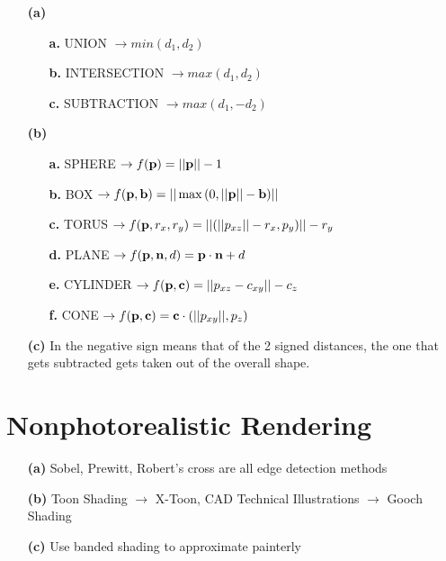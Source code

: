 \documentclass{article}
\begin{document}
\begin{itemize}
    \item[\textbf{(a)}]
        \begin{itemize}
            \item[\textbf{a.}] UNION $\rightarrow{} min(d_1, d_2)$
            \item[\textbf{b.}] INTERSECTION $\rightarrow{} max(d_1, d_2) $
            \item[\textbf{c.}] SUBTRACTION $\rightarrow{} max(d_1, -d_2) $
        \end{itemize}

    \item[\textbf{(b)}]
        \begin{itemize}
            \item[\textbf{a.}] SPHERE $\rightarrow{} f(\mathbf{p}) = ||\mathbf{p}|| - 1$
            \item[\textbf{b.}] BOX $\rightarrow{} f(\mathbf{p}, \mathbf{b}) = ||\max{(0, ||\mathbf{p}||-\mathbf{b})}||$

            \item[\textbf{c.}] TORUS $\rightarrow{} f(\mathbf{p}, r_x, r_y) = ||(||p_{xz}|| - r_x, p_y)|| - r_y$

            \item[\textbf{d.}] PLANE $\rightarrow{} f(\mathbf{p}, \mathbf{n}, d) = \mathbf{p} \cdot \mathbf{n} + d$

            \item[\textbf{e.}] CYLINDER $\rightarrow{} f(\mathbf{p}, \mathbf{c}) = ||p_{xz} - c_{xy}|| - c_z$

            \item[\textbf{f.}] CONE $\rightarrow{} f(\mathbf{p}, \mathbf{c}) = \mathbf{c} \cdot (||p_{xy}||, p_z)$
        \end{itemize}
    \item[\textbf{(c)}] In the negative sign means that of the 2 signed distances, the one that gets subtracted
        gets taken out of the overall shape.
\end{itemize}

\section{Nonphotorealistic Rendering}

\begin{itemize}
    \item[\textbf{(a)}] Sobel, Prewitt,  Robert's cross are all edge detection methods
    \item[\textbf{(b)}] Toon Shading $\rightarrow$ X-Toon, CAD Technical Illustrations $\rightarrow$ Gooch Shading
    \item[\textbf{(c)}] Use banded shading to approximate painterly
\end{itemize}
\end{document}
